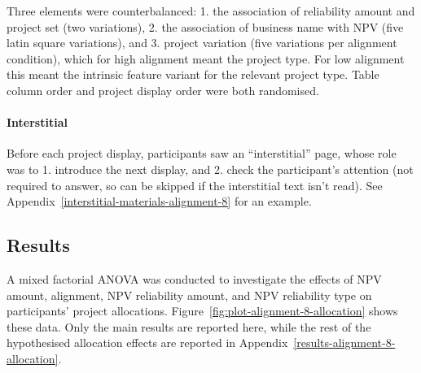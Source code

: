 \documentclass[a4paper, nobind, dvipsnames]{templates/ociamthesis}
\theoremstyle{definition}
\theoremstyle{definition}
\theoremstyle{definition}
\theoremstyle{definition}
\theoremstyle{remark}
\begin{document}
Three elements were counterbalanced: 1. the association of reliability amount
and project set (two variations), 2. the association of business name with NPV
(five latin square variations), and 3. project variation (five variations per
alignment condition), which for high alignment meant the project type. For low
alignment this meant the intrinsic feature variant for the relevant project
type. Table column order and project display order were both randomised.

\hypertarget{interstitial}{%
\paragraph{Interstitial}\label{interstitial}}

Before each project display, participants saw an ``interstitial'' page, whose role
was to 1. introduce the next display, and 2. check the participant's attention
(not required to answer, so can be skipped if the interstitial text isn't read).
See Appendix~\ref{interstitial-materials-alignment-8} for an example.

\hypertarget{results-2}{%
\subsection{Results}\label{results-2}}

A mixed factorial ANOVA was conducted to investigate the effects of NPV amount,
alignment, NPV reliability amount, and NPV reliability type on participants'
project allocations. Figure~\ref{fig:plot-alignment-8-allocation} shows these
data. Only the main results are reported here, while the rest of the
hypothesised allocation effects are reported in
Appendix~\ref{results-alignment-8-allocation}.
\end{document}
